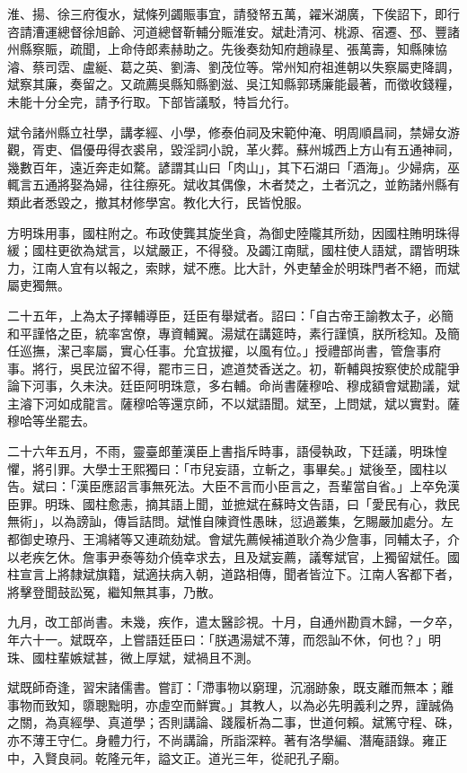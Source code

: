 \begin{pinyinscope}
淮、揚、徐三府復水，斌條列蠲賑事宜，請發帑五萬，糴米湖廣，下俟詔下，即行咨請漕運總督徐旭齡、河道總督靳輔分賑淮安。斌赴清河、桃源、宿遷、邳、豐諸州縣察賑，疏聞，上命侍郎素赫助之。先後奏劾知府趙祿星、張萬壽，知縣陳協濬、蔡司霑、盧綖、葛之英、劉濤、劉茂位等。常州知府祖進朝以失察屬吏降調，斌察其廉，奏留之。又疏薦吳縣知縣劉滋、吳江知縣郭琇廉能最著，而徵收錢糧，未能十分全完，請予行取。下部皆議駁，特旨允行。

斌令諸州縣立社學，講孝經、小學，修泰伯祠及宋範仲淹、明周順昌祠，禁婦女游觀，胥吏、倡優毋得衣裘帛，毀淫詞小說，革火葬。蘇州城西上方山有五通神祠，幾數百年，遠近奔走如騖。諺謂其山曰「肉山」，其下石湖曰「酒海」。少婦病，巫輒言五通將娶為婦，往往瘵死。斌收其偶像，木者焚之，土者沉之，並飭諸州縣有類此者悉毀之，撤其材修學宮。教化大行，民皆悅服。

方明珠用事，國柱附之。布政使龔其旋坐貪，為御史陸隴其所劾，因國柱賄明珠得緩；國柱更欲為斌言，以斌嚴正，不得發。及蠲江南賦，國柱使人語斌，謂皆明珠力，江南人宜有以報之，索賕，斌不應。比大計，外吏輦金於明珠門者不絕，而斌屬吏獨無。

二十五年，上為太子擇輔導臣，廷臣有舉斌者。詔曰：「自古帝王諭教太子，必簡和平謹恪之臣，統率宮僚，專資輔翼。湯斌在講筵時，素行謹慎，朕所稔知。及簡任巡撫，潔己率屬，實心任事。允宜拔擢，以風有位。」授禮部尚書，管詹事府事。將行，吳民泣留不得，罷市三日，遮道焚香送之。初，靳輔與按察使於成龍爭論下河事，久未決。廷臣阿明珠意，多右輔。命尚書薩穆哈、穆成額會斌勘議，斌主濬下河如成龍言。薩穆哈等還京師，不以斌語聞。斌至，上問斌，斌以實對。薩穆哈等坐罷去。

二十六年五月，不雨，靈臺郎董漢臣上書指斥時事，語侵執政，下廷議，明珠惶懼，將引罪。大學士王熙獨曰：「市兒妄語，立斬之，事畢矣。」斌後至，國柱以告。斌曰：「漢臣應詔言事無死法。大臣不言而小臣言之，吾輩當自省。」上卒免漢臣罪。明珠、國柱愈恚，摘其語上聞，並摭斌在蘇時文告語，曰「愛民有心，救民無術」，以為謗訕，傳旨詰問。斌惟自陳資性愚昧，愆過叢集，乞賜嚴加處分。左都御史璙丹、王鴻緒等又連疏劾斌。會斌先薦候補道耿介為少詹事，同輔太子，介以老疾乞休。詹事尹泰等劾介僥幸求去，且及斌妄薦，議奪斌官，上獨留斌任。國柱宣言上將隸斌旗籍，斌適扶病入朝，道路相傳，聞者皆泣下。江南人客都下者，將擊登聞鼓訟冤，繼知無其事，乃散。

九月，改工部尚書。未幾，疾作，遣太醫診視。十月，自通州勘貢木歸，一夕卒，年六十一。斌既卒，上嘗語廷臣曰：「朕遇湯斌不薄，而怨訕不休，何也？」明珠、國柱輩嫉斌甚，微上厚斌，斌禍且不測。

斌既師奇逢，習宋諸儒書。嘗訂：「滯事物以窮理，沉溺跡象，既支離而無本；離事物而致知，隳聰黜明，亦虛空而鮮實。」其教人，以為必先明義利之界，謹誠偽之關，為真經學、真道學；否則講論、踐履析為二事，世道何賴。斌篤守程、硃，亦不薄王守仁。身體力行，不尚講論，所詣深粹。著有洛學編、潛庵語錄。雍正中，入賢良祠。乾隆元年，謚文正。道光三年，從祀孔子廟。


\end{pinyinscope}
